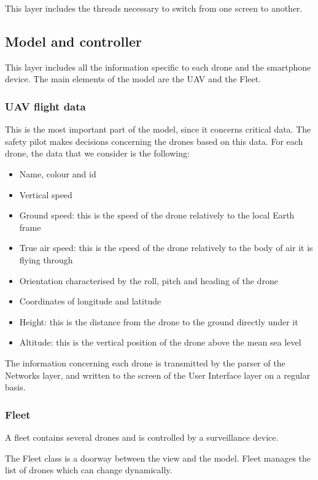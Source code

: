 \documentclass[conference]{IEEEtran}
\begin{document}
This layer includes the threads necessary to switch from one screen to another.

\subsection{Model and controller}
This layer includes all the information specific to each drone and the smartphone device. The main elements of the model are the UAV and the Fleet.

\subsubsection{UAV flight data}
This is the most important part of the model, since it concerns critical data. The safety pilot makes decisions concerning the drones based on this data. For each drone, the data that we consider is the following:
\begin{itemize}
\item Name, colour and id
\item Vertical speed
\item Ground speed: this is the speed of the drone relatively to the local Earth frame
\item True air speed: this is the speed of the drone relatively to the body of air it is flying through
\item Orientation characterised by the roll, pitch and heading of the drone
\item Coordinates of longitude and latitude
\item Height: this is the distance from the drone to the ground directly under it
\item Altitude: this is the vertical position of the drone above the mean sea level
\end{itemize}

The information concerning each drone is transmitted by the parser of the Networks layer, and written to the screen of the User Interface layer on a regular basis. 

\subsubsection{Fleet}
A fleet contains several drones and is controlled by a surveillance device.

The Fleet class is a doorway between the view and the model. Fleet manages the list of drones which can change dynamically.
\end{document}
